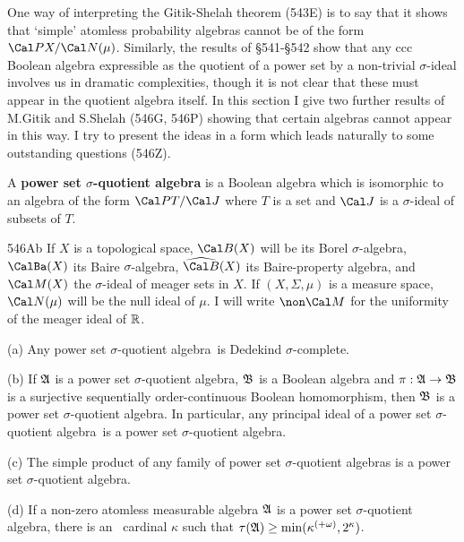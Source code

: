 
\def\chaptername{Real-valued-measurable cardinals}
\def\sectionname{Power set $\sigma$-quotient algebras}

\def\kaqmc{\kappa_{\text{aqmc}}}
\def\pssqa{power set $\sigma$-quotient algebra}
\def\sphaT{\sphat\mskip5mu}


One way of interpreting the Gitik-Shelah theorem (543E) is to say that it
shows that `simple' atomless probability algebras cannot be of the form
$\Cal PX/\Cal N(\mu)$.
Similarly, the results of \S541-\S542 show that any ccc Boolean
algebra expressible as the quotient of a power set by a non-trivial
$\sigma$-ideal involves us
in dramatic complexities, though it is not clear that these must appear in the
quotient algebra itself.   In this section I give two further results of
M.Gitik and S.Shelah (546G, 546P)
showing that certain algebras cannot appear in this way.   I try
to present
the ideas in a form which leads naturally to some outstanding questions
(546Z).

 A {\bf\pssqa} is a Boolean algebra which is
isomorphic
to an algebra of the form $\Cal PT/\Cal J$ where $T$ is a set and
$\Cal J$ is a $\sigma$-ideal of subsets of $T$.

\spheader 546Ab  If $X$ is a
topological space, $\Cal B(X)$ will be its Borel $\sigma$-algebra,
$\CalBa(X)$ its
Baire $\sigma$-algebra, $\widehat{\Cal B}(X)$ its Baire-property algebra,
and $\Cal M(X)$ the $\sigma$-ideal of meager sets in $X$.
If $(X,\Sigma,\mu)$ is a measure space, $\Cal N(\mu)$ will be the null
ideal of $\mu$.   I will write $\non\Cal M$ for the uniformity of the
meager ideal of $\Bbb R$.

 (a) Any \pssqa\ is Dedekind $\sigma$-complete.

(b) If $\frak A$ is a \pssqa, $\frak B$ is a Boolean algebra and
$\pi:\frak A\to\frak B$ is a surjective sequentially order-continuous
Boolean homomorphism, then $\frak B$ is a \pssqa.
In particular, any principal ideal of a \pssqa\ is a \pssqa.

(c) The simple product of any family of \pssqa{s} is a \pssqa.

(d) If a non-zero atomless measurable algebra $\frak A$ is a \pssqa,
there is an \am\
cardinal $\kappa$ such that
$\tau(\frak A)\ge\min(\kappa^{(+\omega)},2^{\kappa})$.

